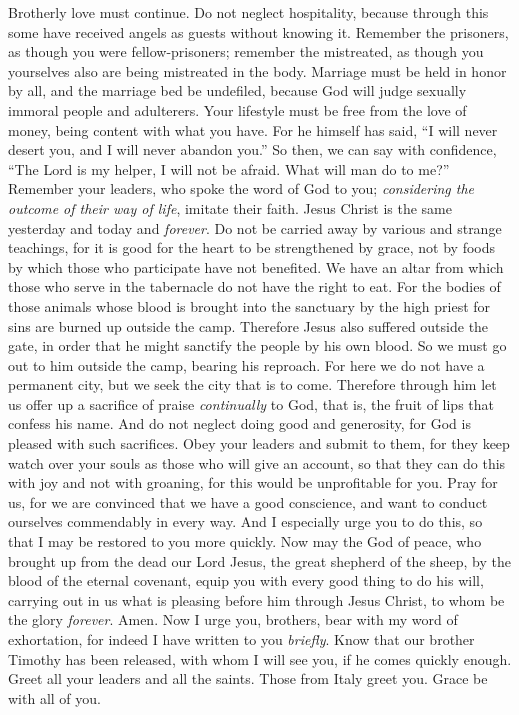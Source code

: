 \begin{biblechapter} %
 Brotherly love must continue.
\verse Do not neglect hospitality, because through this some have received angels as guests without knowing it.
\verse Remember the prisoners, as though you were fellow-prisoners; remember the mistreated, as though you yourselves also are being mistreated in the body.
\verse Marriage must be held in honor by all, and the marriage bed be undefiled, because God will judge sexually immoral people and adulterers.
\verse Your lifestyle must be free from the love of money, being content with what you have. For he himself has said, “I will never desert you, and I will never abandon you.”
\verse So then, we can say with confidence, “The Lord is my helper, I will not be afraid. 
What will man do to me?”
\verse Remember your leaders, who spoke the word of God to you; \textit{considering the outcome of their way of life}, imitate their faith.
\verse Jesus Christ is the same yesterday and today and \textit{forever}.
\verse Do not be carried away by various and strange teachings, for it is good for the heart to be strengthened by grace, not by foods by which those who participate have not benefited.
\verse We have an altar from which those who serve in the tabernacle do not have the right to eat.
\verse For the bodies of those animals whose blood is brought into the sanctuary by the high priest for sins are burned up outside the camp.
\verse Therefore Jesus also suffered outside the gate, in order that he might sanctify the people by his own blood.
\verse So we must go out to him outside the camp, bearing his reproach.
\verse For here we do not have a permanent city, but we seek the city that is to come.
\verse Therefore through him let us offer up a sacrifice of praise \textit{continually} to God, that is, the fruit of lips that confess his name.
\verse And do not neglect doing good and generosity, for God is pleased with such sacrifices.
\verse Obey your leaders and submit to them, for they keep watch over your souls as those who will give an account, so that they can do this with joy and not with groaning, for this would be unprofitable for you.
\verse Pray for us, for we are convinced that we have a good conscience, and want to conduct ourselves commendably in every way.
\verse And I especially urge you to do this, so that I may be restored to you more quickly.
 Now may the God of peace, who brought up from the dead our Lord Jesus, the great shepherd of the sheep, by the blood of the eternal covenant,
\verse equip you with every good thing to do his will, carrying out in us what is pleasing before him through Jesus Christ, to whom be the glory \textit{forever}. Amen.
 Now I urge you, brothers, bear with my word of exhortation, for indeed I have written to you \textit{briefly}.
\verse Know that our brother Timothy has been released, with whom I will see you, if he comes quickly enough.
\verse Greet all your leaders and all the saints. Those from Italy greet you.
\verse Grace be with all of you.
\end{biblechapter}

